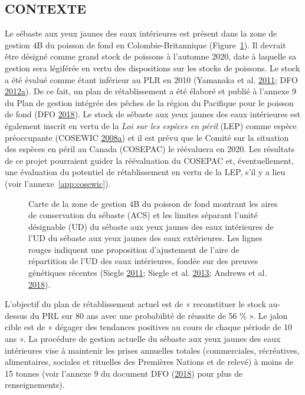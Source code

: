 \documentclass[11pt]{book}
\begin{document}
\hypertarget{sec:introduction-background}{%
\subsection{CONTEXTE}\label{sec:introduction-background}}

Le sébaste aux yeux jaunes des eaux intérieures est présent dans la zone de gestion 4B du poisson de fond en Colombie-Britannique (Figure~\ref{fig:map-4B}). Il devrait être désigné comme grand stock de poissons à l'automne 2020, date à laquelle sa gestion sera légiférée en vertu des dispositions sur les stocks de poissons. Le stock a été évalué comme étant inférieur au PLR en 2010 (Yamanaka et al. \protect\hyperlink{ref-yamanaka2011}{2011}; DFO \protect\hyperlink{ref-dfo2012}{2012}\protect\hyperlink{ref-dfo2012}{a}). De ce fait, un plan de rétablissement a été élaboré et publié à l'annexe 9 du Plan de gestion intégrée des pêches de la région du Pacifique pour le poisson de fond (DFO \protect\hyperlink{ref-ifmp2018}{2018}). Le stock de sébaste aux yeux jaunes des eaux intérieures est également inscrit en vertu de la \emph{Loi sur les espèces en péril} (LEP) comme espèce préoccupante (COSEWIC \protect\hyperlink{ref-cosewic2008}{2008}\protect\hyperlink{ref-cosewic2008}{a}) et il est prévu que le Comité sur la situation des espèces en péril au Canada (COSEPAC) le réévaluera en 2020. Les résultats de ce projet pourraient guider la réévaluation du COSEPAC et, éventuellement, une évaluation du potentiel de rétablissement en vertu de la LEP, s'il y a lieu (voir l'annexe~\ref{app:cosewic}).


\begin{figure}[htb]

{\centering {} 

}

\caption{Carte de la zone de gestion 4B du poisson de fond montrant les aires de conservation du sébaste (ACS) et les limites séparant l'unité désignable (UD) du sébaste aux yeux jaunes des eaux intérieures de l'UD du sébaste aux yeux jaunes des eaux extérieures. Les lignes rouges indiquent une proposition d'ajustement de l'aire de répartition de l'UD des eaux intérieures, fondée sur des preuves génétiques récentes (Siegle \protect\hyperlink{ref-siegle2011}{2011}; Siegle et al. \protect\hyperlink{ref-siegle2013}{2013}; Andrews et al. \protect\hyperlink{ref-andrews2018}{2018}).}\label{fig:map-4B}
\end{figure}
L'objectif du plan de rétablissement actuel est de « reconstituer le stock au-dessus du PRL sur 80 ans avec une probabilité de réussite de 56 \% ». Le jalon cible est de « dégager des tendances positives au cours de chaque période de 10 ans ». La procédure de gestion actuelle du sébaste aux yeux jaunes des eaux intérieures vise à maintenir les prises annuelles totales (commerciales, récréatives, alimentaires, sociales et rituelles des Premières Nations et de relevé) à moins de 15 tonnes (voir l'annexe 9 du document DFO (\protect\hyperlink{ref-ifmp2018}{2018}) pour plus de renseignements).
\end{document}
